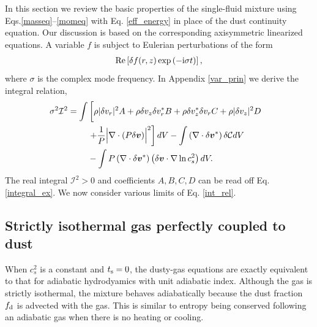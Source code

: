 In this section we review the basic properties of the 
single-fluid mixture using Eqs.\ref{masseq}--\ref{momeq} with 
Eq. \ref{eff_energy} in place of the dust continuity equation. Our
discussion is based on the corresponding axisymmetric linearized
equations. A variable $f$ is
subject to Eulerian perturbations of the form 
\begin{align}
 \operatorname{Re}\left[ \delta f(r,z)\exp{\left(-\mathrm{i}\sigma t\right)}\right], 
\end{align}
where $\sigma$ is the complex mode frequency. In Appendix
\ref{var_prin} we derive the integral relation,  
\begin{align}
  \sigma^2\mathcal{I}^2
&= \int\left[ \rho
  |\dd v_r|^2A + \rho  \dd v_z \dd v_r^* B + \rho \dd v_z^*\dd v_r C +
  \rho |\dd v_z|^2 D\phantom{\frac{1}{1}}\right. \notag\\
&\phantom{===}  \left. + \frac{1}{P}\Bigl\lvert \nabla\cdot\left(P\dd
  \bm{v}\right)\Bigr\rvert^2\right]dV  -\int \left(\nabla\cdot\dd\bm{v}^*\right)\dd\mathcal{C}dV \notag\\
&\phantom{===}
- \int P
  \left(\nabla\cdot\dd\bm{v}^*\right)\left(\dd\bm{v}\cdot\nabla\ln{c_s^2}\right)dV.\label{int_rel}
\end{align} 
The real integral $\mathcal{I}^2>0$ and coefficients $A,B,C,D$ can be
read off Eq. \ref{integral_ex}. %
We now consider various limits of Eq. \ref{int_rel}.    


\subsection{Strictly isothermal gas perfectly coupled to dust}\label{iso_perfect}
When $c_s^2$ is a constant and $t_\mathrm{s}=0$, the dusty-gas equations are
exactly equivalent to that for adiabatic hydrodyamics with unit adiabatic
index. Although the gas is strictly isothermal, the mixture behaves 
adiabatically because the dust fraction $f_\mathrm{d}$ is advected with 
the gas. This is similar to entropy being conserved following an
adiabatic gas when there is no heating or cooling.  

